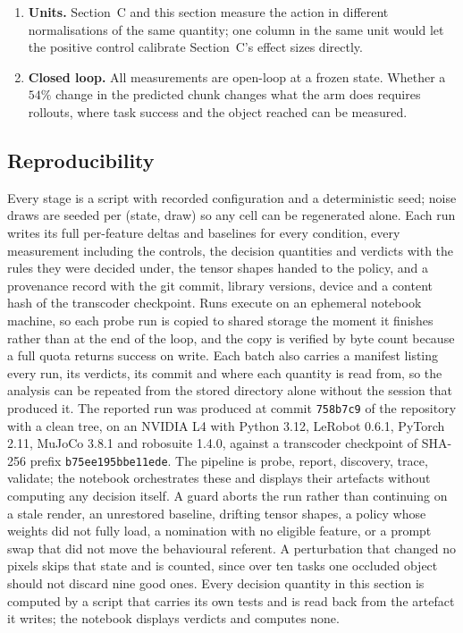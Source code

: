\begin{enumerate}
drawer task of the case study, and the footprint adjustment carries more of the
weight. A second object type and a non-colour perturbation such as texture
would each widen what the design can claim.
\item \textbf{Units.} Section~C and this section measure the action in
different normalisations of the same quantity; one column in the same unit
would let the positive control calibrate Section~C's effect sizes directly.
\item \textbf{Closed loop.} All measurements are open-loop at a frozen state.
Whether a $54\%$ change in the predicted chunk changes what the arm does
requires rollouts, where task success and the object reached can be measured.
\end{enumerate}

\subsection{Reproducibility}

Every stage is a script with recorded configuration and a deterministic seed;
noise draws are seeded per (state, draw) so any cell can be regenerated alone.
Each run writes its full per-feature deltas and baselines for every condition,
every measurement including the controls, the decision quantities and verdicts
with the rules they were decided under, the tensor shapes handed to the policy,
and a provenance record with the git commit, library versions, device and a
content hash of the transcoder checkpoint. Runs execute on an ephemeral notebook machine, so each probe run is copied
to shared storage the moment it finishes rather than at the end of the loop,
and the copy is verified by byte count because a full quota returns success on
write. Each batch also carries a manifest listing every run, its verdicts, its
commit and where each quantity is read from, so the analysis can be repeated
from the stored directory alone without the session that produced it. The reported run was produced at commit \texttt{758b7c9} of the
repository with a clean tree, on an NVIDIA L4 with Python 3.12, LeRobot 0.6.1,
PyTorch 2.11, MuJoCo 3.8.1 and robosuite 1.4.0, against a transcoder
checkpoint of SHA-256 prefix \texttt{b75ee195bbe11ede}. The pipeline is probe, report, discovery, trace, validate; the
notebook orchestrates these and displays their artefacts without computing any
decision itself. A guard aborts the run rather than continuing on a stale render, an
unrestored baseline, drifting tensor shapes, a policy whose weights did not
fully load, a nomination with no eligible feature, or a prompt swap that did
not move the behavioural referent. A perturbation that changed no pixels skips
that state and is counted, since over ten tasks one occluded object should not
discard nine good ones. Every decision quantity in this section is computed by
a script that carries its own tests and is read back from the artefact it
writes; the notebook displays verdicts and computes none.
